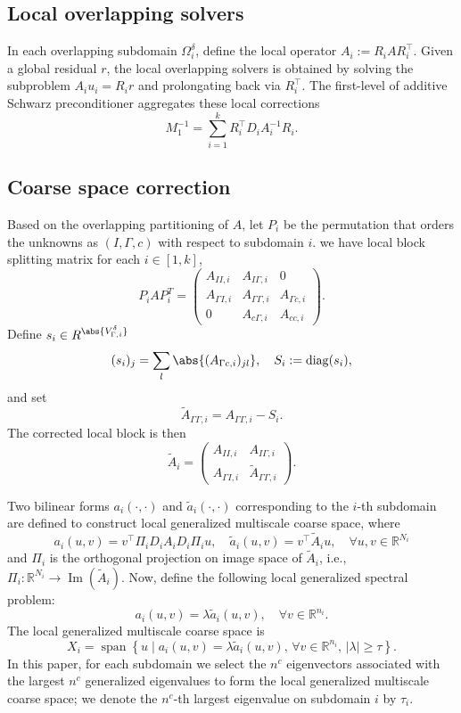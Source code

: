\documentclass{article}
\DeclareMathOperator{\Span}{span}
\DeclareMathOperator{\Diag}{diag}
\theoremstyle{definition}
\theoremstyle{remark}
\begin{document}
\subsection{Local overlapping solvers}
In each overlapping subdomain $\Omega_i^{\delta}$, define the local operator $A_i := R_i A R_i^{\top}$. 
Given a global residual $r$, the local overlapping solvers is obtained by solving the subproblem $A_i u_i = R_i r$ and prolongating back via $R_i^{\top}$.
The first-level of additive Schwarz preconditioner aggregates these local corrections
\begin{equation}\label{ams1}
  M_1^{-1} = \sum_{i=1}^k R_{i}^\top D_iA_i^{-1} R_{i}.
\end{equation}


\subsection{Coarse space correction}
Based on the overlapping partitioning of $A$, let $P_i$ be the permutation that orders the unknowns as $(I, \Gamma, c)$ with respect to subdomain $i$.
we have local block splitting matrix for each $i \in [1, k]$,
\[
P_i AP_i^T = \begin{pmatrix} 
A_{I I,i} & A_{I \Gamma,i} & 0\\ 
A_{\Gamma I,i} & A_{\Gamma \Gamma,i} & A_{\Gamma c,i}\\
0 & A_{c\Gamma,i} & A_{cc,i} 
\end{pmatrix}.
\]
Define $s_i \in R^{\abs{V_{\Gamma,i}^{\delta}}}$
\[
(s_i)_j = \sum_l \abs{(A_{\Gamma c,i})_{jl}}, \quad S_i := \Diag(s_i),
\]
and set 
\[
\tilde{A}_{\Gamma\Gamma,i} = A_{\Gamma\Gamma,i} - S_i.
\]
The corrected local block is then
\[
\tilde{A}_{i} = \begin{pmatrix} 
A_{II,i} & A_{I \Gamma,i} \\ 
A_{\Gamma I,i} & \tilde{A}_{\Gamma \Gamma,i}
\end{pmatrix}.
\]

Two bilinear forms $a_i(\cdot, \cdot)$ and $\tilde{a}_i(\cdot, \cdot)$ corresponding to the $i$-th subdomain are defined to construct local generalized multiscale coarse space, where
\[
a_i(u, v) = v^{\top} \Pi_i D_i A_{i} D_i \Pi_i u, \quad 
\tilde{a}_i(u, v) = v^{\top} \tilde{A}_{i} u, \quad \forall u,v \in \mathbb{R}^{N_i}
\]
and \( \Pi_i \) is the orthogonal projection on image space of $\tilde{A}_{i}$, i.e., $\Pi_i:\mathbb{R}^{N_i}\to \operatorname{Im}(\tilde A_i)$. Now, define the following local generalized spectral problem:
\begin{equation}\label{eq:a_i_func}
a_i(u, v) = \lambda \tilde{a}_i(u, v), \quad \forall v \in \mathbb{R}^{n_i}.
\end{equation}
The local generalized multiscale coarse space is 
\[
X_i = \Span \left\{ u \mid a_i(u, v) = \lambda \tilde{a}_i(u, v), \, \forall v \in \mathbb{R}^{n_i}, \, |\lambda| \geq \tau \right\}.
\]
In this paper, for each subdomain we select the $n^c$ eigenvectors associated with the largest $n^c$ generalized eigenvalues to form the local generalized multiscale coarse space; we denote the $n^c$-th largest eigenvalue on subdomain $i$ by $\tau_i$.
\end{document}
